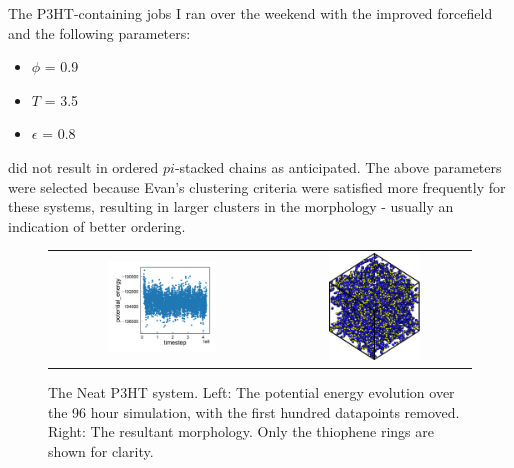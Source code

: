 \documentclass[12pt]{article}
\begin{document}
The P3HT-containing jobs I ran over the weekend with the improved forcefield and the following parameters:
\begin{itemize}
    \item{$\phi$ = 0.9}
    \item{$T$ = 3.5}
    \item{$\epsilon$ = 0.8}
\end{itemize}
did not result in ordered $pi$-stacked chains as anticipated.
The above parameters were selected because Evan's clustering criteria were satisfied more frequently for these systems, resulting in larger clusters in the morphology - usually an indication of better ordering.


\begin{figure}[h!]\centering
    \begin{tabular}{cc}
        \includegraphics[width=0.5\textwidth]{Figures/P3HTPE.pdf}&
	    \includegraphics[width=0.5\textwidth]{Figures/P3HTMorph.png}
    \end{tabular}
    \caption{The Neat P3HT system. Left: The potential energy evolution over the 96 hour simulation, with the first hundred datapoints removed. Right: The resultant morphology. Only the thiophene rings are shown for clarity.}
	\label{fig:P3HTPE}
\end{figure}
\end{document}
